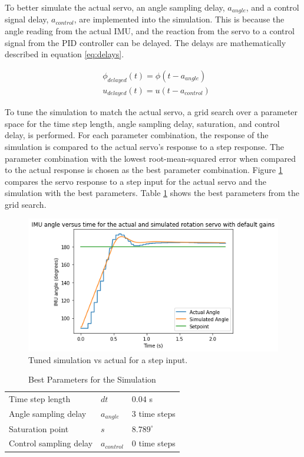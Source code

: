 \documentclass[letterpaper,12pt]{article}
\newcommand{\degrees}{^\circ}
\begin{document}
To better simulate the actual servo, an angle sampling delay, $a_{angle}$, and a control signal delay, $a_{control}$, are  implemented into the simulation. This is because the angle reading from the actual IMU, and the reaction from the servo to a control signal from the PID controller can be delayed. The delays are mathematically described in equation \ref{eq:delays}.

\begin{equation}
\begin{split}
	\label{eq:delays}
	& \phi_{delayed}(t) = \phi(t - a_{angle}) \\
	& u_{delayed}(t) = u(t - a_{control})
\end{split}
\end{equation}

To tune the simulation to match the actual servo, a grid search over a parameter space for the time step length, angle sampling delay, saturation, and control delay, is performed. For each parameter combination, the response of the simulation is compared to the actual servo's response to a step response. The parameter combination with the lowest root-mean-squared error when compared to the actual response is chosen as the best parameter combination. Figure \ref{fig:paramcombo} compares the servo response to a step input for the actual servo and the simulation with the best parameters. Table \ref{tab:bestparams} shows the best parameters from the grid search.

\begin{figure}[H]
\centering \includegraphics[width=0.8\columnwidth]{paramcombo.png}
\caption{\label{fig:paramcombo}Tuned simulation vs actual for a step input.}
\end{figure}

\begin{table}[H]
	\begin{center}
		\caption{Best Parameters for the Simulation}
        \label{tab:bestparams}
        \begin{tabular}{l|l|l}
					\hline
        	Time step length & $dt$ & $0.04$ s \\
					Angle sampling delay & $a_{angle}$ & $3$ time steps \\
					Saturation point & $s$ & $8.789 \degrees$ \\
					Control sampling delay & $a_{control}$ & $0$ time steps \\
        \end{tabular}
	\end{center}
\end{table}
\end{document}
